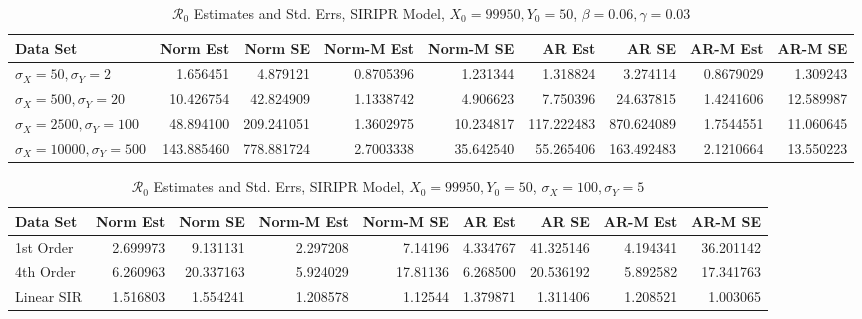 \documentclass[12pt]{article}
\newcommand{\rr}{\ensuremath{\mathcal{R}_0}}
\begin{document}
\begin{table}[H]
	
	\caption{\label{tab:}$\rr$ Estimates and Std. Errs, SIRIPR Model,
		$X_0 = 99950, Y_0 = 50$, $\beta = 0.06, \gamma = 0.03$}
	\centering
	\begin{footnotesize}
		\begin{tabular}[t]{l|r|r|r|r|r|r|r|r}
			\hline
			Data Set & Norm Est & Norm SE & Norm-M Est & Norm-M SE & AR Est & AR SE & AR-M Est & AR-M SE\\
			\hline
			$\sigma_X = 50, \sigma_Y = 2$ & 1.656451 & 4.879121 & 0.8705396 & 1.231344 & 1.318824 & 3.274114 & 0.8679029 & 1.309243\\
			\hline
			$\sigma_X = 500, \sigma_Y = 20$ & 10.426754 & 42.824909 & 1.1338742 & 4.906623 & 7.750396 & 24.637815 & 1.4241606 & 12.589987\\
			\hline
			$\sigma_X = 2500, \sigma_Y = 100$ & 48.894100 & 209.241051 & 1.3602975 & 10.234817 & 117.222483 & 870.624089 & 1.7544551 & 11.060645\\
			\hline
			$\sigma_X = 10000, \sigma_Y = 500$ & 143.885460 & 778.881724 & 2.7003338 & 35.642540 & 55.265406 & 163.492483 & 2.1210664 & 13.550223\\
			\hline
		\end{tabular}
	\end{footnotesize}
\end{table}

\begin{table}[H]
	
	\caption{\label{tab:}$\rr$ Estimates and Std. Errs, SIRIPR Model,
		$X_0 = 99950, Y_0 = 50$, $\sigma_X = 100, \sigma_Y = 5$}
	\centering
	\begin{footnotesize}
		\begin{tabular}[t]{l|r|r|r|r|r|r|r|r}
			\hline
			Data Set & Norm Est & Norm SE & Norm-M Est & Norm-M SE & AR Est & AR SE & AR-M Est & AR-M SE\\
			\hline
			1st Order & 2.699973 & 9.131131 & 2.297208 & 7.14196 & 4.334767 & 41.325146 & 4.194341 & 36.201142\\
			\hline
			4th Order & 6.260963 & 20.337163 & 5.924029 & 17.81136 & 6.268500 & 20.536192 & 5.892582 & 17.341763\\
			\hline
			Linear SIR & 1.516803 & 1.554241 & 1.208578 & 1.12544 & 1.379871 & 1.311406 & 1.208521 & 1.003065\\
			\hline
		\end{tabular}
	\end{footnotesize}
\end{table}
\end{document}
